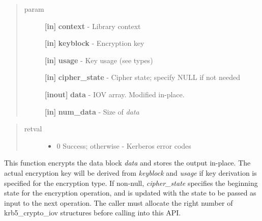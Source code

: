 \documentclass[letterpaper,10pt,english]{sphinxmanual}
\begin{document}
\begin{fulllineitems}
\label{appdev/refs/api/krb5_c_encrypt_iov:krb5_c_encrypt_iov}
\end{fulllineitems}

\begin{quote}\begin{description}
\item[{param}] \leavevmode
\textbf{{[}in{]}} \textbf{context} - Library context

\textbf{{[}in{]}} \textbf{keyblock} - Encryption key

\textbf{{[}in{]}} \textbf{usage} - Key usage (see  types)

\textbf{{[}in{]}} \textbf{cipher\_state} - Cipher state; specify NULL if not needed

\textbf{{[}inout{]}} \textbf{data} - IOV array. Modified in-place.

\textbf{{[}in{]}} \textbf{num\_data} - Size of \emph{data}

\end{description}\end{quote}
\begin{quote}\begin{description}
\item[{retval}] \leavevmode\begin{itemize}
\item {} 
0   Success; otherwise - Kerberos error codes

\end{itemize}

\end{description}\end{quote}

This function encrypts the data block \emph{data} and stores the output in-place. The actual encryption key will be derived from \emph{keyblock} and \emph{usage} if key derivation is specified for the encryption type. If non-null, \emph{cipher\_state} specifies the beginning state for the encryption operation, and is updated with the state to be passed as input to the next operation. The caller must allocate the right number of krb5\_crypto\_iov structures before calling into this API.
\end{document}
